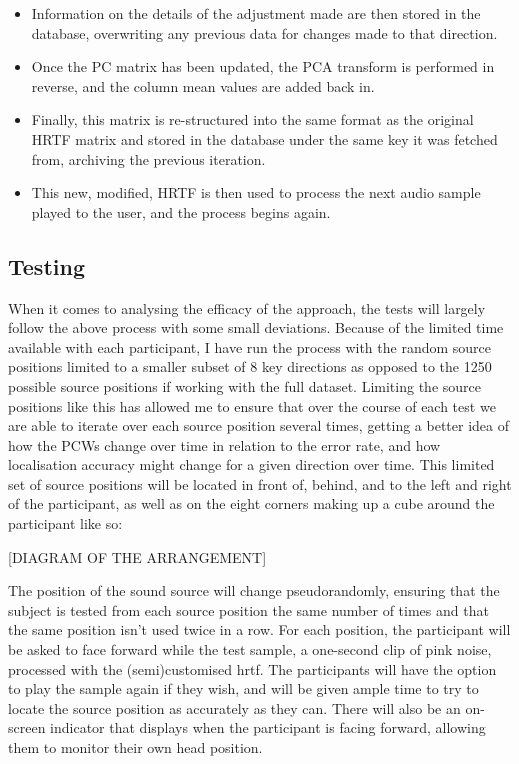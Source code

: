 \begin{itemize}
\begin{itemize}
\end{itemize}
\item Information on the details of the adjustment made are then stored in the database, overwriting any previous data for changes made to that direction.
\item Once the PC matrix has been updated, the PCA transform is performed in reverse, and the column mean values are added back in.
\item Finally, this matrix is re-structured into the same format as the original HRTF matrix and stored in the database under the same key it was fetched from, archiving the previous iteration. 
\item This new, modified, HRTF is then used to process the next audio sample played to the user, and the process begins again. 
\end{itemize}

\subsection{Testing}
When it comes to analysing the efficacy of the approach, the tests will largely follow the above process with some small deviations. Because of the limited time available with each participant, I have run the process with the random source positions limited to a smaller subset of 8 key directions as opposed to the 1250 possible source positions if working with the full dataset. Limiting the source positions like this has allowed me to ensure that over the course of each test we are able to iterate over each source position several times, getting a better idea of how the PCWs change over time in relation to the error rate, and how localisation accuracy might change for a given direction over time. This limited set of source positions will be located in front of, behind, and to the left and right of the participant, as well as on the eight corners making up a cube around the participant like so: 

[DIAGRAM OF THE ARRANGEMENT]

The position of the sound source will change pseudorandomly, ensuring that the subject is tested from each source position the same number of times and that the same position isn't used twice in a row. For each position, the participant will be asked to face forward while the test sample, a one-second clip of pink noise, processed with the (semi)customised hrtf. The participants will have the option to play the sample again if they wish, and will be given ample time to try to locate the source position as accurately as they can. There will also be an on-screen indicator that displays when the participant is facing forward, allowing them to monitor their own head position.

